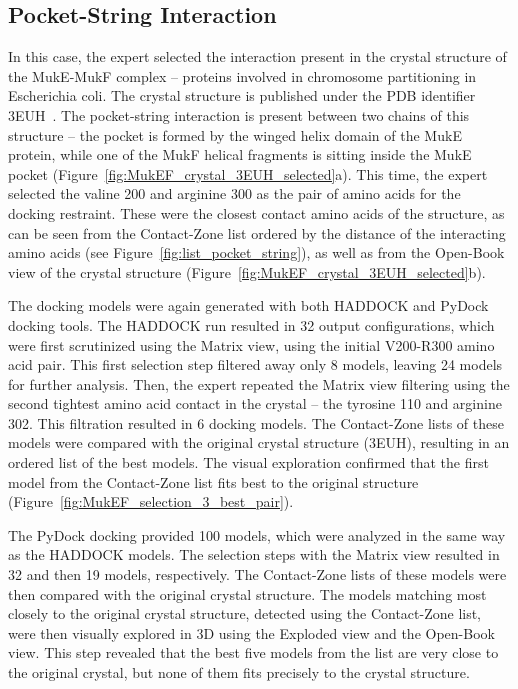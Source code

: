 \documentclass{bmcart}
\def\OpBook {Open-Book view\xspace}
\def\ExpView {Exploded view\xspace}
\def\MatView {Matrix view\xspace}
\def\CoZoList{Contact-Zone list\xspace}
\def\CoZoLists{Contact-Zone lists\xspace}
\begin{document}
\subsection*{Pocket-String Interaction}
In this case, the expert selected the interaction present in the crystal structure of the MukE-MukF complex -- proteins involved in chromosome partitioning in Escherichia coli. 
The crystal structure is published under the PDB identifier 3EUH~\cite{Woo}. 
The pocket-string interaction is present between two chains of this structure -- the pocket is formed by the winged helix domain of the MukE protein, while one of the MukF helical fragments is sitting inside the MukE pocket (Figure~\ref{fig:MukEF_crystal_3EUH_selected}a). 
This time, the expert selected the valine 200 and arginine 300 as the pair of amino acids for the docking restraint. 
These were the closest contact amino acids of the structure, as can be seen from the \CoZoList ordered by the distance of the interacting amino acids (see Figure~\ref{fig:list_pocket_string}), as well as from the \OpBook of the crystal structure (Figure~\ref{fig:MukEF_crystal_3EUH_selected}b). 

The docking models were again generated with both HADDOCK and PyDock docking tools.
The HADDOCK run resulted in 32 output configurations, which were first scrutinized using the \MatView, using the initial V200-R300 amino acid pair. 
This first selection step filtered away only 8 models, leaving 24 models for further analysis. 
Then, the expert repeated the \MatView filtering using the second tightest amino acid contact in the crystal -- the tyrosine 110 and arginine 302. 
This filtration resulted in 6 docking models. 
The \CoZoLists of these models were compared with the original crystal structure (3EUH), resulting in an ordered list of the best models.
The visual exploration confirmed that the first model from the \CoZoList fits best to the original structure (Figure~\ref{fig:MukEF_selection_3_best_pair}). 

The PyDock docking provided 100 models, which were analyzed in the same way as the HADDOCK models. 
The selection steps with the \MatView resulted in 32 and then 19 models, respectively. 
The \CoZoLists of these models were then compared with the original crystal structure.
The models matching most closely to the original crystal structure, detected using the \CoZoList, were then visually explored in 3D using the \ExpView and the \OpBook.
This step revealed that the best five models from the list are very close to the original crystal, but none of them fits precisely to the crystal structure.
\end{document}
